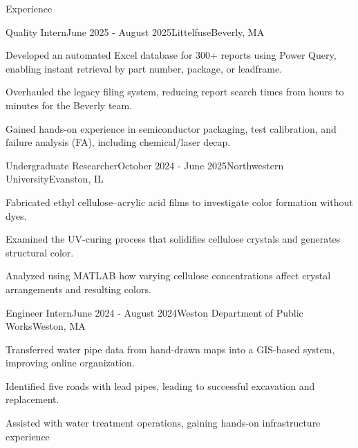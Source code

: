 \documentclass[
    a4paper,
    9pt,
]{resume}
\begin{document}
\begin{rSection}{Experience}

	\begin{rSubsection}{Quality Intern}{June 2025 - August 2025}{Littelfuse}{Beverly, MA}
		\item Developed an automated Excel database for 300+ reports using Power Query, enabling instant retrieval by part number, package, or leadframe.
		\item Overhauled the legacy filing system, reducing report search times from hours to minutes for the Beverly team.
		\item Gained hands-on experience in semiconductor packaging, test calibration, and failure analysis (FA), including chemical/laser decap.
	\end{rSubsection}

	\begin{rSubsection}{Undergraduate Researcher}{October 2024 - June 2025}{Northwestern University}{Evanston, IL}
		\item Fabricated ethyl cellulose–acrylic acid films to investigate color formation without dyes.
		\item Examined the UV-curing process that solidifies cellulose crystals and generates structural color.
		\item Analyzed using MATLAB how varying cellulose concentrations affect crystal arrangements and resulting colors.
	\end{rSubsection}



	\begin{rSubsection}{Engineer Intern}{June 2024 - August 2024}{Weston Department of Public Works}{Weston, MA}
		\item Transferred water pipe data from hand-drawn maps into a GIS-based system, improving online organization.
		\item Identified five roads with lead pipes, leading to successful excavation and replacement.
		\item Assisted with water treatment operations, gaining hands-on infrastructure experience
	\end{rSubsection}



\end{rSection}
\end{document}
